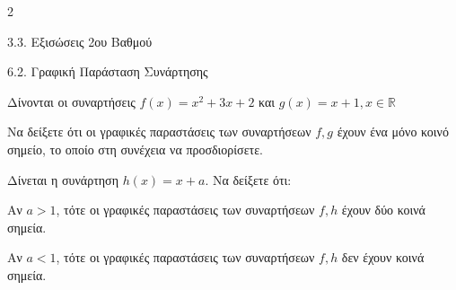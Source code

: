\begin{ylh}{2}
    \item 3.3. Εξισώσεις 2ου Βαθμού
    \item 6.2. Γραφική Παράσταση Συνάρτησης
\end{ylh}
Δίνονται οι συναρτήσεις $f(x) = x^2 + 3x + 2$ και $g(x) = x + 1, x \in \mathbb{R}$

\begin{alist}
\item Να δείξετε ότι οι γραφικές παραστάσεις των συναρτήσεων $f, g$ έχουν ένα μόνο κοινό σημείο, το οποίο στη συνέχεια να προσδιορίσετε.

\item Δίνεται η συνάρτηση $h(x) = x + a$. Να δείξετε ότι:

\end{alist}
\begin{alist}
\item
  Αν $a > 1$, τότε οι γραφικές παραστάσεις των συναρτήσεων $f, h$ έχουν δύο κοινά σημεία.
\item
  Αν $a < 1$, τότε οι γραφικές παραστάσεις των συναρτήσεων $f, h$ δεν έχουν κοινά σημεία.

\end{alist}

